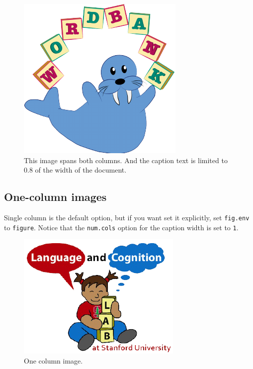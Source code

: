 \documentclass[10pt, letterpaper]{article}
\newenvironment{CodeChunk}{}{}
\begin{document}
\begin{CodeChunk}
\begin{figure}[h]

{\centering \includegraphics{figs/2-col-image-1} 

}

\caption[This image spans both columns]{This image spans both columns. And the caption text is limited to 0.8 of the width of the document.}\label{fig:2-col-image}
\end{figure}
\end{CodeChunk}

\hypertarget{one-column-images}{%
\subsection{One-column images}\label{one-column-images}}

Single column is the default option, but if you want set it explicitly,
set \texttt{fig.env} to \texttt{figure}. Notice that the
\texttt{num.cols} option for the caption width is set to \texttt{1}.

\begin{CodeChunk}
\begin{figure}[H]

{\centering \includegraphics{figs/image-1} 

}

\caption[One column image]{One column image.}\label{fig:image}
\end{figure}
\end{CodeChunk}
\end{document}
